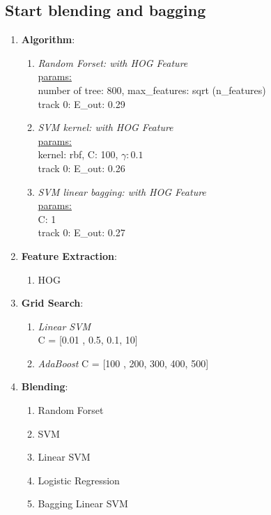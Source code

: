 \documentclass[12pt]{article}
\theoremstyle{definition}
\theoremstyle{remark}
\begin{document}
\subsection{Start blending and bagging}
\begin{enumerate}
  \item \textbf{Algorithm}:
      \begin{enumerate}
          \item {\em Random Forset: with HOG Feature\/} \\
            \underline{params:} \\
            number of tree: 800, max\_features: sqrt (n\_features)\\
            {\color{red}track 0: E\_out: 0.29}
          \item {\em SVM kernel: with HOG Feature\/} \\
            \underline{params:} \\
            kernel: rbf, C: 100, \(\gamma: 0.1 \)\\
            {\color{red}track 0: E\_out: 0.26}
          \item {\em SVM linear bagging: with HOG Feature\/} \\
            \underline{params:} \\
            C: 1 \\
            {\color{red}track 0: E\_out: 0.27}
      \end{enumerate}
    \item \textbf{Feature Extraction}:
      \begin{enumerate}
        \item HOG
      \end{enumerate}
    \item \textbf{Grid Search}:
      \begin{enumerate}
        \item {\em Linear SVM\/} \\
          C = [0.01 , 0.5, 0.1, 10] \\
        \item {\em AdaBoost}
          C = [100 , 200, 300, 400, 500] \\
      \end{enumerate}
    \item \textbf{Blending}:
      \begin{enumerate}
        \item Random Forset
        \item SVM
        \item Linear SVM
        \item Logistic Regression
        \item Bagging Linear SVM
      \end{enumerate}
\end{enumerate}
\end{document}
